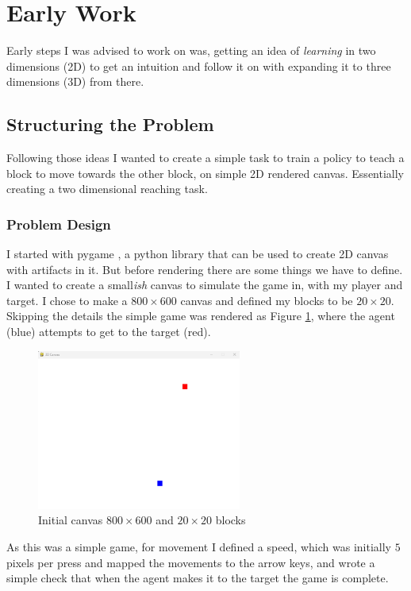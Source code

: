 \section{Early Work}
Early steps I was advised to work on was, getting an idea of \emph{learning} in two dimensions (2D) to get an intuition and follow it on with expanding it to three dimensions (3D) from there.

\subsection{Structuring the Problem}
Following those ideas I wanted to create a simple task to train a policy to teach a block to move towards the other block, on simple 2D rendered canvas. Essentially creating a two dimensional reaching task.

\subsubsection{Problem Design} 
I started with pygame \cite{pygame}, a python library that can be used to create 2D canvas with artifacts in it. But before rendering there are some things we have to define. I wanted to create a small\emph{ish} canvas to simulate the game in, with my player and target. I chose to make a $800 \times 600$ canvas and defined my blocks to be $20 \times 20$. Skipping the details the simple game was rendered as Figure \ref{fig:initial-canvas}, where the agent (blue) attempts to get to the target (red).

\begin{figure}[h]
  \centering
  \includegraphics[width=0.6\textwidth]{assets/early-work/initial-canvas.png}
  \caption{Initial canvas $800 \times 600$ and $20 \times 20$ blocks}\label{fig:initial-canvas}
\end{figure}

As this was a simple game, for movement I defined a speed, which was initially $5$ pixels per press and mapped the movements to the arrow keys, and wrote a simple check that when the agent makes it to the target the game is complete.

